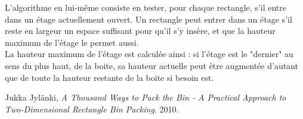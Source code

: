 \documentclass[12pt]{article}
\begin{document}
L'algorithme en lui-même consiste en tester, pour chaque rectangle, s'il entre dans un étage actuellement ouvert. Un rectangle peut entrer dans un étage s'il reste en largeur un espace suffisant pour qu'il s'y insère, et que la hauteur maximum de l'étage le permet aussi. \\
La hauteur maximum de l'étage est calculée ainsi : si l'étage est le "dernier" au sens du plus haut, de la boite, sa hauteur actuelle peut être augmentée d'autant que de toute la hauteur restante de la boite si besoin est. 

\newpage
\begin{thebibliography}{9}
         Jukka Jylänki,
          \emph{A Thousand Ways to Pack the Bin - A Practical Approach to Two-Dimensional Rectangle Bin Packing}.
          2010.
\end{thebibliography}
\end{document}
